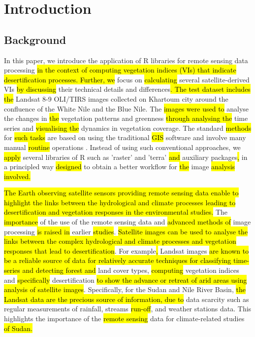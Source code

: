 \documentclass[jimaging,article,submit,pdftex,moreauthors]{Definitions/mdpi}
\begin{document}
\section{Introduction}

\subsection{Background}

In this paper, we introduce the application of R libraries for remote sensing data processing \hl{in the context of computing vegetation indices (VIs) that indicate desertification processes. Further, we} focus on \hl{calculating }several satellite-derived VIs \hl{by discussing} their technical details and differences\hl{. The test dataset includes the} Landsat 8-9 OLI/TIRS images collected on Khartoum city around the confluence of the White Nile and the Blue Nile.\hl{ }The \hl{images were used to }analyse\hl{ }the changes in \hl{the }vegetation patterns and greenness \hl{through analysing the }time series and \hl{visualising the} dynamics in vegetation coverage. The standard\hl{ methods }for \hl{such tasks} are based on using the traditional \hl{GIS }software\hl{ }\cite{AHMED201829} and involve many manual \hl{routine }operations \cite{Hawash,YOUSSEF2020103777,6621869,Aldoma}. Instead of using such conventional approaches, we \hl{apply} several libraries of R such as 'raster' and 'terra' \hl{and} auxiliary packages\hl{,} in a principled way \hl{designed }to obtain a better workflow for \hl{the }image \hl{analysis involved.} 

\hl{The Earth observing satellite sensors providing remote sensing data enable to highlight the links between the hydrological and climate processes leading to desertification and vegetation responses in the environmental studies. }The \hl{importance} of the use of the remote sensing data and \hl{advanced methods of }image processing \hl{is raised in }earlier \hl{studies}\cite{su14137871,ELBASTAWESY2017252,SOSNOWSKI201651,GORSEVSKI201364}. \hl{Satellite images can be used to analyse the links between the complex hydrological and climate processes and vegetation responses that lead to desertification}. For example\hl{, }Landsat images \hl{are known to be a reliable source of data for relatively accurate techniques for classifying time-series and detecting forest and }land cover types\cite{WILSON2002385,Lemenkova202227,4293065,SALIH2017S21}, \hl{computing} vegetation indices \cite{5416935,Lemenkova202229,1026428} and \hl{specifically} desertification \cite{RIVERAMARIN2022104829} \hl{to show the advance or retreat of arid areas using analysis of satellite images}. Specifically, for the Sudan and Nile River Basin, \hl{the Landsat data are the precious source of information, due to }data scarcity \cite{Ali} such as regular measurements of rainfall, streams \hl{run-off}, and  weather stations data. This highlights the importance of the \hl{remote sensing} data for climate-related studies \hl{of Sudan.}
\end{document}
